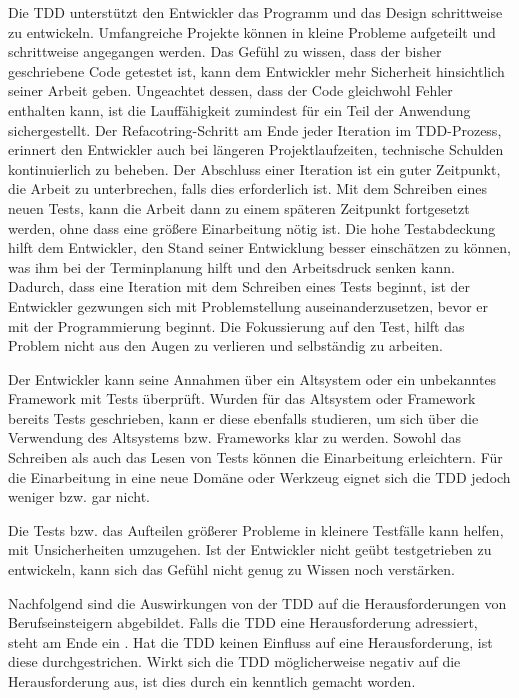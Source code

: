 Die TDD unterstützt den Entwickler das Programm und das Design schrittweise zu entwickeln. Umfangreiche Projekte können in kleine Probleme aufgeteilt und schrittweise angegangen werden. Das Gefühl zu wissen, dass der bisher geschriebene Code getestet ist, kann dem Entwickler mehr Sicherheit hinsichtlich seiner Arbeit geben. Ungeachtet dessen, dass der Code gleichwohl Fehler enthalten kann, ist die Lauffähigkeit zumindest für ein Teil der Anwendung sichergestellt. Der Refacotring-Schritt am Ende jeder Iteration im TDD-Prozess, erinnert den Entwickler auch bei längeren Projektlaufzeiten, technische Schulden kontinuierlich zu beheben. Der Abschluss einer Iteration ist ein guter Zeitpunkt, die Arbeit zu unterbrechen, falls dies erforderlich ist. Mit dem Schreiben eines neuen Tests, kann die Arbeit dann zu einem späteren Zeitpunkt fortgesetzt werden, ohne dass eine größere Einarbeitung nötig ist. Die hohe Testabdeckung hilft dem Entwickler, den Stand seiner Entwicklung besser einschätzen zu können, was ihm bei der Terminplanung hilft und den Arbeitsdruck senken kann. Dadurch, dass eine Iteration mit dem Schreiben eines Tests beginnt, ist der Entwickler gezwungen sich mit Problemstellung auseinanderzusetzen, bevor er mit der Programmierung beginnt. Die Fokussierung auf den Test, hilft das Problem nicht aus den Augen zu verlieren und selbständig zu arbeiten.

Der Entwickler kann seine Annahmen über ein Altsystem oder ein unbekanntes Framework mit Tests überprüft. Wurden für das Altsystem oder Framework bereits Tests geschrieben, kann er diese ebenfalls studieren, um sich über die Verwendung des Altsystems bzw. Frameworks klar zu werden. Sowohl das Schreiben als auch das Lesen von Tests können die Einarbeitung erleichtern. Für die Einarbeitung in eine neue Domäne oder Werkzeug eignet sich die TDD jedoch weniger bzw. gar nicht.

Die Tests bzw. das Aufteilen größerer Probleme in kleinere Testfälle kann helfen, mit Unsicherheiten umzugehen. Ist der Entwickler nicht geübt testgetrieben zu entwickeln, kann sich das Gefühl nicht genug zu Wissen noch verstärken.

Nachfolgend sind die Auswirkungen von der TDD auf die Herausforderungen von Berufseinsteigern abgebildet. Falls die TDD eine Herausforderung adressiert, steht am Ende ein \checkmark. Hat die TDD keinen Einfluss auf eine Herausforderung, ist diese durchgestrichen. Wirkt sich die TDD möglicherweise negativ auf die Herausforderung aus, ist dies durch ein \danger kenntlich gemacht worden.

